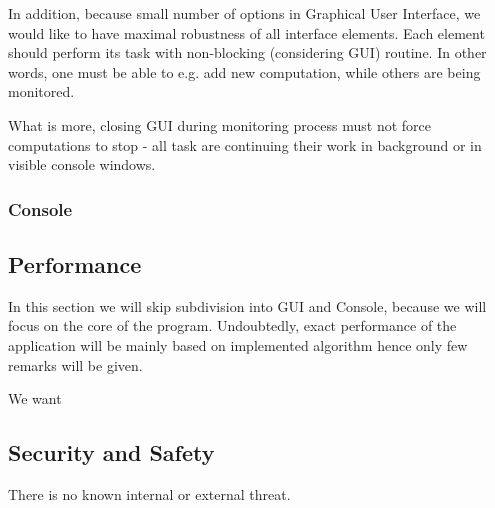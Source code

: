 \documentclass{article}
\begin{document}
In addition, because small number of options in Graphical User Interface, we would like to have maximal robustness of all interface elements. Each element should perform its task with non-blocking (considering GUI) routine. In other words, one must be able to e.g. add new computation, while others are being monitored.

What is more, closing GUI during monitoring process must not force computations to stop - all task are continuing their work in background or in visible console windows.

\subsubsection{Console}

%
%
\subsection{Performance}
In this section we will skip subdivision into GUI and Console, because we will focus on the core of the program. Undoubtedly, exact performance of the application will be mainly based on implemented algorithm hence only few remarks will be given.

We want 


%
%
\subsection{Security and Safety}
There is no known internal or external threat.
\end{document}
